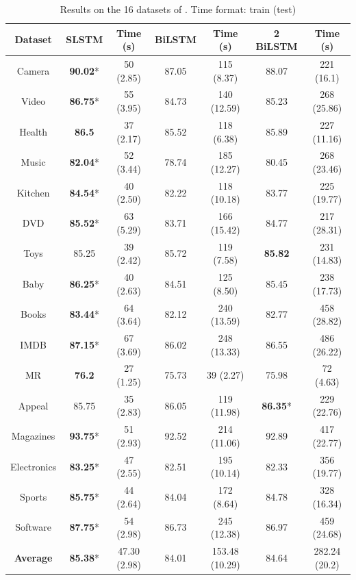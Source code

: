 \documentclass[11pt,a4paper]{article}
\begin{document}
\begin{table}[t]
	\centering
	\begin{tabular}{cccc|c|c|c|c|c|c|}
		\hline
		\multicolumn{4}{|c|}{\textbf{Dataset}}& \textbf{SLSTM}&\textbf{Time (s)}&\textbf{BiLSTM} &\textbf{Time (s)}&\textbf{2 BiLSTM} &\textbf{Time (s)}\\
		\hline
		\multicolumn{4}{|c|}{Camera}&\textbf{90.02}*&50 (2.85)&87.05&115 (8.37)&88.07&221 (16.1)\\
		\multicolumn{4}{|c|}{Video}&\textbf{86.75}*&55 (3.95)&84.73&140 (12.59)&85.23&268 (25.86)\\
		\multicolumn{4}{|c|}{Health}&\textbf{86.5}&37 (2.17)&85.52&118 (6.38)&85.89&227 (11.16)\\
		\multicolumn{4}{|c|}{Music}&\textbf{82.04}*&52 (3.44)&78.74&185 (12.27)&80.45&268 (23.46)\\
		\multicolumn{4}{|c|}{Kitchen}&\textbf{84.54}*&40 (2.50)&82.22&118 (10.18)&83.77&225 (19.77)\\
		\multicolumn{4}{|c|}{DVD}&\textbf{85.52}*&63 (5.29)&83.71&166 (15.42)&84.77&217 (28.31)\\
		\multicolumn{4}{|c|}{Toys}&85.25&39 (2.42)&85.72&119 (7.58)&\textbf{85.82}&231 (14.83)\\
		\multicolumn{4}{|c|}{Baby}&\textbf{86.25}*&40 (2.63)&84.51&125 (8.50)&85.45&238 (17.73)\\
		\multicolumn{4}{|c|}{Books}&\textbf{83.44}*&64 (3.64)&82.12&240 (13.59)&82.77&458 (28.82)\\
		\multicolumn{4}{|c|}{IMDB}&\textbf{87.15}*&67 (3.69)&86.02&248 (13.33)&86.55&486 (26.22)\\
		\multicolumn{4}{|c|}{MR}&\textbf{76.2}&27 (1.25)&75.73&39 (2.27)&75.98&72 (4.63)\\
		\multicolumn{4}{|c|}{Appeal}&85.75&35 (2.83)&86.05&119 (11.98)&\textbf{86.35}*&229 (22.76)\\
		\multicolumn{4}{|c|}{Magazines}&\textbf{93.75}*&51 (2.93)&92.52&214 (11.06)&92.89&417 (22.77)\\
		\multicolumn{4}{|c|}{Electronics}&\textbf{83.25}*&47 (2.55)&82.51&195 (10.14)&82.33&356 (19.77)\\
		\multicolumn{4}{|c|}{Sports}&\textbf{85.75}*&44 (2.64)&84.04&172 (8.64)&84.78&328 (16.34)\\
		\multicolumn{4}{|c|}{Software}&\textbf{87.75}*&54 (2.98)&86.73&245 (12.38)&86.97&459 (24.68)\\
		\hline
		\multicolumn{4}{|c|}{\textbf{Average}} &\textbf{85.38}*&47.30 (2.98)&84.01&153.48 (10.29)&84.64&282.24 (20.2)\\
		\hline
	\end{tabular}
	\caption{\label{classification}Results on the 16 datasets of . Time format: train (test)}
\end{table}
\end{document}
